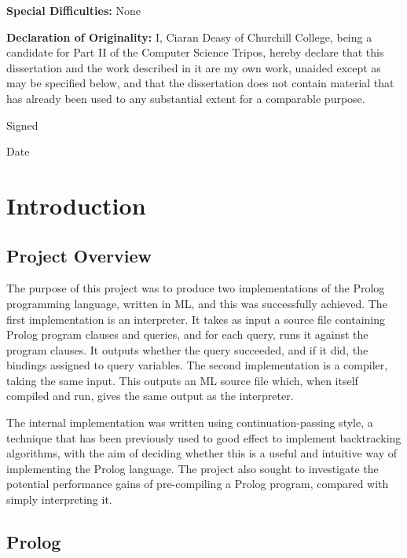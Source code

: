 \documentclass[12pt]{article}
\begin{document}
\vspace{0.15in}

{\bf Special Difficulties:} None

{\bf Declaration of Originality:}
I, Ciaran Deasy of Churchill College, being a candidate for Part II of the Computer Science Tripos, hereby declare that this dissertation and the work described in it are my own work, unaided except as may be specified below, and that the dissertation does not contain material that has already been used to any substantial extent for a comparable purpose. 

Signed %

Date %

\vfil
\eject

\tableofcontents 

\newpage

\section{Introduction}


\subsection{Project Overview}

The purpose of this project was to produce two implementations of the Prolog programming language, written in ML, and this was successfully achieved. 
The first implementation is an interpreter.
It takes as input a source file containing Prolog program clauses and queries, and for each query, runs it against the program clauses. 
It outputs whether the query succeeded, and if it did, the bindings assigned to query variables.
The second implementation is a compiler, taking the same input. 
This outputs an ML source file which, when itself compiled and run, gives the same output as the interpreter.

The internal implementation was written using continuation-passing style, a technique that has been previously used to good effect to implement backtracking algorithms, with the aim of deciding whether this is a useful and intuitive way of implementing the Prolog language. 
The project also sought to investigate the potential performance gains of pre-compiling a Prolog program, compared with simply interpreting it.

\subsection{Prolog}
\end{document}
